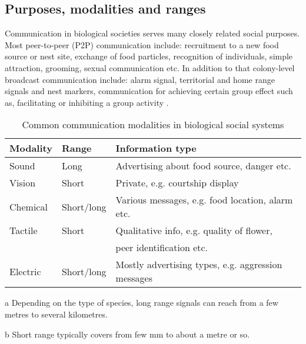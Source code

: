 \subsection{Purposes, modalities and ranges}
Communication in biological societies serves many closely related social purposes. Most peer-to-peer (P2P) communication include: recruitment to a new food source or nest site, exchange of food particles, recognition of individuals, simple attraction, grooming, sexual communication etc. In addition to that colony-level broadcast communication include: alarm signal, territorial and home range signals and nest markers, communication for achieving certain group effect such as, facilitating or inhibiting  a group activity \cite{Holldobler1990}.\\
\begin{table}
\caption{Common communication modalities in biological social systems}
\label{table:bio-comm-modalities}
\begin{center}
\begin{threeparttable}
\begin{tabular}{|l|l|l|}
\hline \textbf{Modality} & \textbf{Range} & \textbf{Information type}\\
\hline Sound & Long\tnote{a} & Advertising about food  source,  danger etc. \\                                                                                                                                               
\hline Vision & Short\tnote{b}  & Private, e.g. courtship display \\
\hline Chemical  & Short/long & Various messages, e.g. food location, alarm etc.\\
\hline Tactile & Short & Qualitative info, e.g. quality of flower,\\ & & peer identification etc.\\
\hline Electric & Short/long & Mostly advertising types, e.g. aggression messages\\
\hline
\end{tabular}
\begin{tablenotes}
\item [a]Depending on the type of species, long range signals can reach from a few metres to several kilometres.
\item [b]Short range typically covers from few mm to about a metre or so.
\end{tablenotes}
\end{threeparttable}
\end{center}
\end{table}
